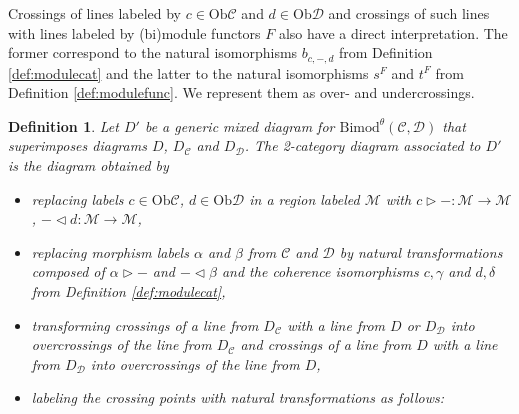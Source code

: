 \documentclass[1.5pt, a4paper]{article}
\newcommand{\mac}{\mathcal C}
\newcommand{\mad}{\mathcal D}
\newcommand{\mam}{\mathcal M}
\newcommand{\Ob}{\mathrm{Ob}}
\newcommand{\Bimod}{\mathrm{Bimod}}
\newcommand{\inv}[0]{{-1}}
\newtheorem{definition}[theorem]{Definition}
\begin{document}
Crossings of  lines labeled by   $c\in \Ob \mac$ and $d\in \Ob \mad$ and crossings of such lines with lines labeled by (bi)module functors $F$ also have a direct interpretation. The former correspond to the natural isomorphisms $b_{c,-,d}$   from Definition \ref{def:modulecat} and the latter  to the natural isomorphisms $s^F$ and $t^F$ from Definition \ref{def:modulefunc}. We represent them as over- and undercrossings.


\begin{definition} Let $D'$ be a generic mixed diagram for $\Bimod^\theta(\mac,\mad)$ that superimposes  diagrams $D$, $D_\mac$ and  $D_\mad$. The 2-category diagram associated to $D'$  is the diagram obtained by 
\begin{itemize}
\item replacing  labels $c\in\Ob\mac$, $d\in \Ob\mad$ in a region labeled   $\mam$ with  $c\rhd-:\mam\to\mam$, $-\lhd d:\mam\to \mam$,

\item replacing morphism labels $\alpha$ and $\beta$ from $\mac$ and $\mad$ by  natural transformations  composed of   $\alpha\rhd -$ and $-\lhd\beta$ and the coherence isomorphisms $c,\gamma$ and $d,\delta$ from Definition \ref{def:modulecat},

\item transforming crossings of a line from 
 $D_\mac$ with a line from $D$ or  $D_\mad$  into overcrossings of the line from $D_\mac$ and crossings of a line from $D$ with a line from $D_\mad$ into overcrossings of the line from $D$, 
 
 \item labeling the crossing points  with natural transformations as follows:
\end{itemize}
\end{definition}
\end{document}
